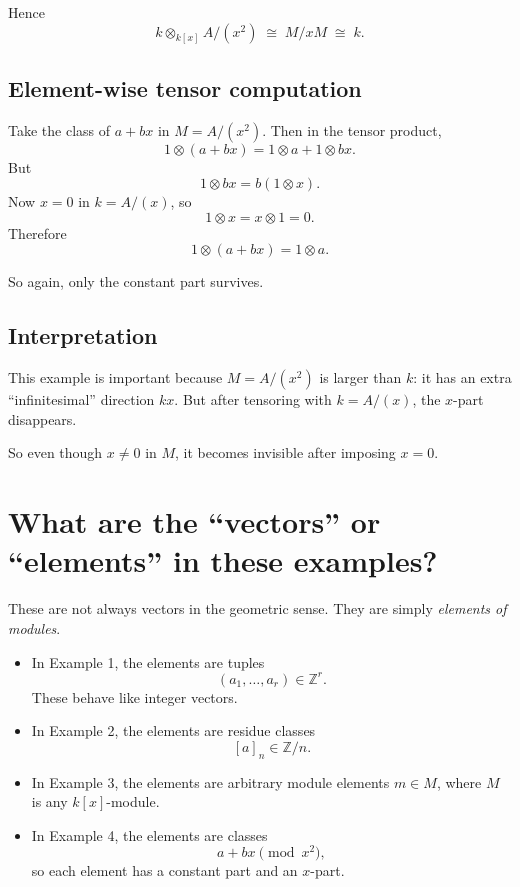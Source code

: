 \documentclass[12pt,a4paper]{article}
\theoremstyle{plain}
\theoremstyle{definition}      %
\begin{document}
	Hence
	\[
	k\otimes_{k[x]} A/(x^2)
	\;\cong\;
	M/xM
	\;\cong\;
	k.
	\]
	
	\subsection{Element-wise tensor computation}
	
	Take the class of \(a+bx\) in \(M=A/(x^2)\). Then in the tensor product,
	\[
	1\otimes (a+bx)
	=
	1\otimes a + 1\otimes bx.
	\]
	But
	\[
	1\otimes bx = b(1\otimes x).
	\]
	Now \(x=0\) in \(k=A/(x)\), so
	\[
	1\otimes x = x\otimes 1 = 0.
	\]
	Therefore
	\[
	1\otimes (a+bx)=1\otimes a.
	\]
	
	So again, only the constant part survives.
	
	\subsection{Interpretation}
	
	This example is important because \(M=A/(x^2)\) is larger than \(k\): it has an extra ``infinitesimal'' direction \(kx\). But after tensoring with \(k=A/(x)\), the \(x\)-part disappears.
	
	So even though \(x\neq 0\) in \(M\), it becomes invisible after imposing \(x=0\).
	
	\section{What are the ``vectors'' or ``elements'' in these examples?}
	
	These are not always vectors in the geometric sense. They are simply \emph{elements of modules}.
	
	\begin{itemize}
		\item In Example 1, the elements are tuples
		\[
		(a_1,\dots,a_r)\in \mathbb Z^r.
		\]
		These behave like integer vectors.
		
		\item In Example 2, the elements are residue classes
		\[
		[a]_n\in \mathbb Z/n.
		\]
		
		\item In Example 3, the elements are arbitrary module elements \(m\in M\), where \(M\) is any \(k[x]\)-module.
		
		\item In Example 4, the elements are classes
		\[
		a+bx \pmod{x^2},
		\]
		so each element has a constant part and an \(x\)-part.
	\end{itemize}
	
\end{document}

